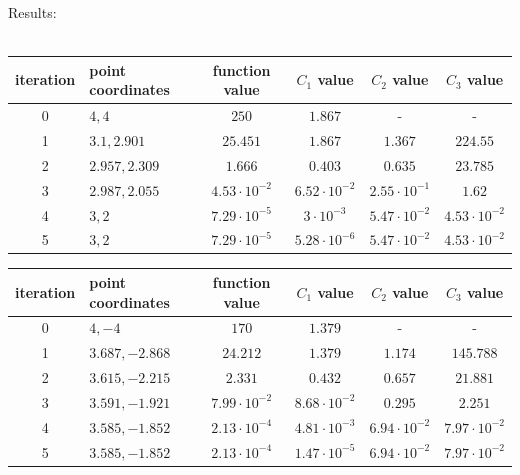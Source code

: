\documentclass[12pt]{article}
\begin{document}
\begin{table}[H]
	Results: \\ \\
	\begin{tabularx}{\textwidth}{c|X|c|c|c|c|}
		iteration & point coordinates & function value & $C_1$ value & $C_2$ value & $C_3$ value\\
		\hline
		0 & $4, 4$ & $250$ & $1.867$ & - & - \\
		\hline					
		1 & $3.1, 2.901$ & $25.451$ & $1.867$ & $1.367$ & $224.55$ \\
		\hline
		2 & $2.957, 2.309$  & $1.666$ & $0.403$ & $0.635$ & $23.785$ \\ 
		\hline
		3 & $2.987 ,2.055$ & $4.53\cdot10^{-2}$ & $6.52\cdot10^{-2}$ & $2.55\cdot10^{-1}$  & $1.62$ \\
		\hline
		4 & $3, 2$ & $7.29\cdot10^{-5}$ & $3\cdot10^{-3}$ & $5.47\cdot10^{-2}$ & $4.53\cdot10^{-2}$ \\
		\hline
		5 & $3, 2$ & $7.29\cdot10^{-5}$ & $5.28\cdot10^{-6}$ & $5.47\cdot10^{-2}$ & $4.53\cdot10^{-2}$\\
		\hline
	\end{tabularx}	
\end{table}		

\begin{table}[H]
	\begin{tabularx}{\textwidth}{c|X|c|c|c|c|}
		iteration & point coordinates & function value & $C_1$ value & $C_2$ value & $C_3$ value\\
		\hline
		0 & $4, -4$ & $170$ & $1.379$ & - & - \\
		\hline
		1 & $3.687, -2.868$ & $24.212$ & $1.379$ & $1.174$ & $145.788$ \\ 
		\hline
		2 & $3.615, -2.215$ & $2.331$ & $0.432$ & $0.657$ & $21.881$ \\
		\hline
		3 & $3.591, -1.921$ & $7.99\cdot10^{-2}$ & $8.68\cdot10^{-2}$ & $0.295$ & $2.251$ \\
		\hline
		4 & $3.585, -1.852$ & $2.13\cdot10^{-4}$ & $4.81\cdot10^{-3}$ & $6.94\cdot10^{-2}$ & $7.97\cdot10^{-2}$ \\
		\hline
		5 & $3.585, -1.852$ & $2.13\cdot10^{-4}$ & $1.47\cdot10^{-5}$ & $6.94\cdot10^{-2}$ & $7.97\cdot10^{-2}$ \\ 
		\hline
	\end{tabularx}	
\end{table}	
\end{document}
